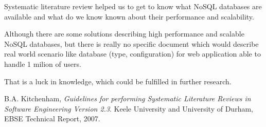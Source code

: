 \documentclass[times, 10pt,twocolumn]{article}
\newcounter{firstbib}
\begin{document}

Systematic literature review helped us to get to know what NoSQL databases are available 
and what do we know known about their performance and scalability.   

Although there are some solutions describing high performance and scalable NoSQL databases, but there  
is really no specific document which would describe real world scenario like database (type, configuration) for web 
application able to handle 1 milion of users.

That is a luck in knowledge, which could be fulfilled in further research.


\renewcommand{\refname}{Article references}

\begin{thebibliography}{9}

	  B.A. Kitchenham,
	  \emph{Guidelines for performing Systematic Literature Reviews in Software Engineering Version 2.3}.
	  Keele University and University of Durham,
	  EBSE Technical Report,
	  2007.

	\setcounter{firstbib}{\value{enumiv}}

\end{thebibliography}

\renewcommand{\refname}{Systematic research review references} 
\end{document}
